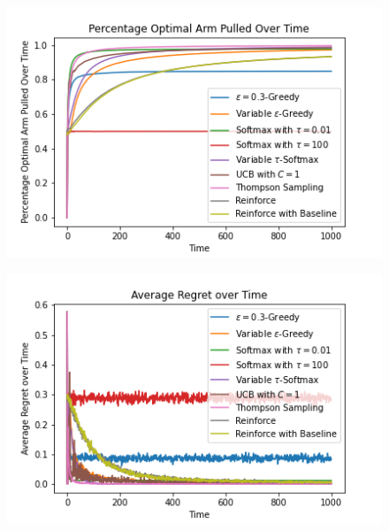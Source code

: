 \documentclass{article}
\begin{document}
	\begin{figure}[H]
	\graphicspath{ {../Experiments/Interesting_Reinforce/} }
	\centering
	\begin{minipage}{.5\textwidth}
	  \centering
	  \includegraphics[width=\linewidth]{Percentage_Optimal_Arm_Pulled_Over_Time.png}
	  \label{percent_optimal}
	\end{minipage}%
	\begin{minipage}{.5\textwidth}
	  \centering
	  \includegraphics[width=\linewidth]{Average_Regret_over_Time.png}
	  \label{avg_regret}
	\end{minipage}
	\end{figure}
	
\end{document}
